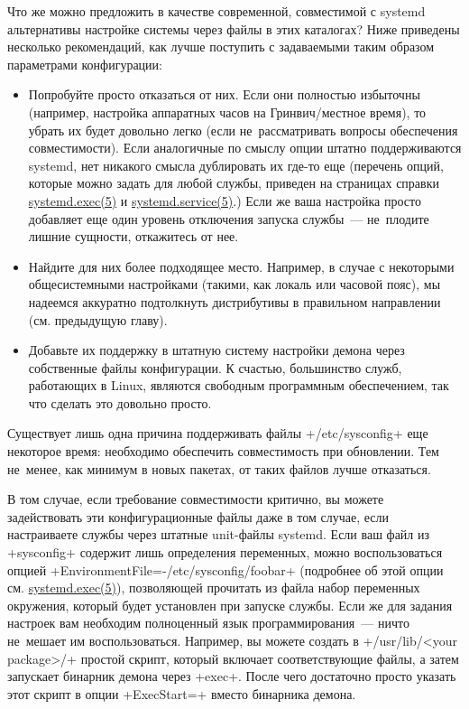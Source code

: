 \documentclass[10pt,oneside,a4paper]{article}
\begin{document}
Что же можно предложить в качестве современной, совместимой с systemd
альтернативы настройке системы через файлы в этих каталогах? Ниже приведены
несколько рекомендаций, как лучше поступить с задаваемыми таким образом параметрами
конфигурации:
\begin{itemize}
	\item Попробуйте просто отказаться от них. Если они полностью избыточны (например,
		настройка аппаратных часов на Гринвич/местное время), то убрать
		их будет довольно легко (если не~рассматривать вопросы
		обеспечения совместимости). Если аналогичные по смыслу опции
		штатно поддерживаются systemd, нет никакого смысла дублировать
		их где-то еще (перечень опций, которые можно задать для любой
		службы, приведен на страницах справки
		\href{http://0pointer.de/public/systemd-man/systemd.exec.html}{systemd.exec(5)}
		и
		\href{http://0pointer.de/public/systemd-man/systemd.service.html}{systemd.service(5)}.)
		Если же ваша настройка просто добавляет еще один уровень
		отключения запуска службы~--- не~плодите лишние сущности,
		откажитесь от нее.
	\item Найдите для них более подходящее место. Например, в случае с
		некоторыми общесистемными настройками (такими, как локаль или
		часовой пояс), мы надеемся аккуратно подтолкнуть дистрибутивы в
		правильном направлении (см. предыдущую главу).
	\item Добавьте их поддержку в штатную систему настройки демона через
		собственные файлы конфигурации. К счастью, большинство служб,
		работающих в Linux, являются свободным программным обеспечением,
		так что сделать это довольно просто.
\end{itemize}

Существует лишь одна причина поддерживать файлы +/etc/sysconfig+ еще некоторое
время: необходимо обеспечить совместимость при обновлении. Тем не~менее, как
минимум в новых пакетах, от таких файлов лучше отказаться.

В том случае, если требование совместимости критично, вы можете задействовать
эти конфигурационные файлы даже в том случае, если настраиваете службы через
штатные unit-файлы systemd. Если ваш файл из +sysconfig+ содержит лишь
определения переменных, можно воспользоваться опцией
+EnvironmentFile=-/etc/sysconfig/foobar+ (подробнее об этой опции см.
\href{http://0pointer.de/public/systemd-man/systemd.exec.html}{systemd.exec(5)}),
позволяющей прочитать из файла набор переменных окружения, который будет
установлен при запуске службы. Если же для задания настроек вам необходим
полноценный язык программирования~--- ничто не~мешает им воспользоваться.
Например, вы можете создать в +/usr/lib/<your package>/+ простой скрипт,
который включает соответствующие файлы, а затем запускает бинарник демона через
+exec+. После чего достаточно просто указать этот скрипт в опции +ExecStart=+
вместо бинарника демона.
\end{document}
